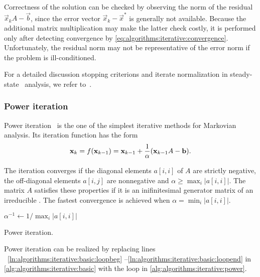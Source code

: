 Correctness of the solution can be checked by observing the norm of
the residual $\vec{x}_{k} A - \vec{b}$, since the error vector
$\vec{x}_k - \vec{x}^*$ is generally not available. Because the
additional matrix multiplication may make the latter check costly, it
is performed only after detecting convergence by
\vref{eq:algorithms:iterative:convergence}. Unfortunately, the
residual norm may not be representative of the error norm if the
problem is ill-conditioned.

For a detailed discussion stopping criterions and iterate
normalization in steady-state \CTMC\ analysis, we refer
to~\citep[Section~10.3.5]{stewart2009probability}.

\subsubsection{Power iteration}
\label{ssec:algorithms:power}

Power iteration~\citep[Section~10.3.1]{stewart2009probability} is the
one of the simplest iterative methods for Markovian analysis. Its
iteration function has the form
\begin{equation}
  \vec{x}_k = f(\vec{x}_{k - 1}) = \vec{x}_{k - 1} + \frac{1}{\alpha} \mleft(
  \vec{x}_{k - 1} A - \vec{b} \mright) \text.
\end{equation}

The iteration converges if the diagonal elements $a[i,i]$ of $A$ are
strictly negative, the off-diagonal elements $a[i,j]$ are nonnegative
and $\alpha \ge \max_{i} \lvert a[i,i] \rvert$. The matrix $A$
satisfies these properties if it is an inifinitesimal generator matrix
of an irreducible \CTMC. The fastest convergence is achieved when
$\alpha = \min_{i} \lvert a[i,i] \rvert$.

\begin{algorithm}
  $\alpha^{-1} \gets 1 / \max_{i} \lvert a[i,i] \rvert$\;
  \caption{Power iteration.}
  \label{alg:algorithms:iterative:power}
\end{algorithm}

Power iteration can be realized by replacing lines%
~\ref{ln:algorithms:iterative:basic:loopbeg}%
--\ref{ln:algorithms:iterative:basic:loopend} in
\vref{alg:algorithms:iterative:basic} with the loop in
\vref{alg:algorithms:iterative:power}.

